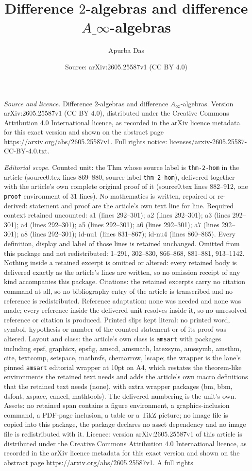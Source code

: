 \documentclass[10pt,a4paper]{amsart}
\title[Difference $2$-algebras and difference $A\_\infty$-algebras]{Difference $2$-algebras and difference $A\_\infty$-algebras}
\author{Apurba Das}
\date{Source: arXiv:2605.25587v1 (CC BY 4.0)}
\begin{document}
\maketitle

\noindent\emph{Source and licence.} Difference $2$-algebras and difference $A_\infty$-algebras. Version arXiv:2605.25587v1 (CC BY 4.0), distributed under the Creative Commons Attribution 4.0 International licence, as recorded in the arXiv licence metadata for this exact version and shown on the abstract page https://arxiv.org/abs/2605.25587v1. Full rights notice: licenses/arxiv-2605.25587-CC-BY-4.0.txt.\par\smallskip

\noindent\textit{Editorial scope.} Counted unit: the Thm whose source label is \texttt{thm-2-hom} in the article (source0.tex lines 869--880, source label \texttt{thm-2-hom}), delivered together with the article's own complete original proof of it (source0.tex lines 882--912, one \texttt{proof} environment of 31 lines). No mathematics is written, repaired or re-derived: statement and proof are the article's own text line for line. Required context retained uncounted: a1 (lines 292--301); a2 (lines 292--301); a3 (lines 292--301); a4 (lines 292--301); a5 (lines 292--301); a6 (lines 292--301); a7 (lines 292--301); a8 (lines 292--301); id-nu1 (lines 831--867); id-nu4 (lines 860--865). Every definition, display and label of those lines is retained unchanged. Omitted from this package and not redistributed: 1--291, 302--830, 866--868, 881--881, 913--1142. Nothing inside a retained excerpt is omitted or altered: every retained body is delivered exactly as the article's lines are written, so no omission receipt of any kind accompanies this package. Citations: the retained excerpts carry no citation command at all, so no bibliography entry of the article is transcribed and no reference is redistributed. Reference adaptation: none was needed and none was made; every reference inside the delivered unit resolves inside it, so no unresolved reference or citation is produced. Printed slips kept literal: no printed word, symbol, hypothesis or number of the counted statement or of its proof was altered. Layout and class: the article's own class is \texttt{amsart} with packages including epsf, graphicx, epsfig, amscd, amsmath, latexsym, amssymb, amsthm, cite, textcomp, setspace, mathrsfs, chemarrow, lscape; the wrapper is the lane's pinned \texttt{amsart} editorial wrapper at 10pt on A4, which restates the theorem-like environments the retained text needs and adds the article's own macro definitions that the retained text needs (none), with extra wrapper packages (bm, bbm, dsfont, xspace, cancel, mathtools). The delivered numbering is the unit's own. Assets: no retained span contains a figure environment, a graphics-inclusion command, a PDF-page inclusion, a table or a TikZ picture; no image file is copied into this package, the package declares no asset dependency and no image file is redistributed with it. Licence: version arXiv:2605.25587v1 of this article is distributed under the Creative Commons Attribution 4.0 International licence, as recorded in the arXiv licence metadata for this exact version and shown on the abstract page https://arxiv.org/abs/2605.25587v1. A full rights 
\end{document}
